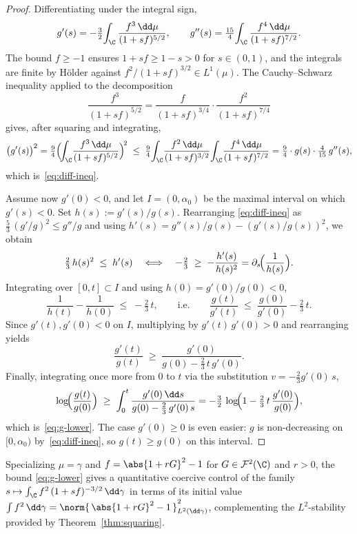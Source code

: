 \begin{proof}
Differentiating under the integral sign,
\[
g'(s) = -\tfrac{3}{2}\!\int_{\C}\frac{f^3\,\dd\mu}{(1+sf)^{5/2}},
\qquad
g''(s) = \tfrac{15}{4}\!\int_{\C}\frac{f^4\,\dd\mu}{(1+sf)^{7/2}}.
\]
The bound $f \ge -1$ ensures $1 + sf \ge 1-s > 0$ for $s \in (0,1)$, and
the integrals are finite by H\"older against $f^2/(1+sf)^{3/2} \in
L^1(\mu)$. The Cauchy--Schwarz inequality applied to the decomposition
\[
\frac{f^3}{(1+sf)^{5/2}}
= \frac{f}{(1+sf)^{3/4}} \cdot \frac{f^2}{(1+sf)^{7/4}}
\]
gives, after squaring and integrating,
\[
\bigl(g'(s)\bigr)^2
= \tfrac{9}{4}\Bigl(\!\int_{\C}\!\frac{f^3\,\dd\mu}{(1+sf)^{5/2}}\Bigr)^{\!2}
\;\le\; \tfrac{9}{4}\!\int_{\C}\!\frac{f^2\,\dd\mu}{(1+sf)^{3/2}}
\!\int_{\C}\!\frac{f^4\,\dd\mu}{(1+sf)^{7/2}}
= \tfrac{9}{4}\cdot g(s)\cdot \tfrac{4}{15}\,g''(s),
\]
which is~\eqref{eq:diff-ineq}.

\medskip

Assume now $g'(0) < 0$, and let $I = (0,\alpha_0)$ be the maximal interval
on which $g'(s) < 0$. Set $h(s) := g'(s)/g(s)$. Rearranging
\eqref{eq:diff-ineq} as $\tfrac{5}{3}\,(g'/g)^2 \le g''/g$ and using
$h'(s) = g''(s)/g(s) - (g'(s)/g(s))^2$, we obtain
\[
\tfrac{2}{3}\,h(s)^2
\;\le\; h'(s)
\quad\Longleftrightarrow\quad
-\tfrac{2}{3}
\;\ge\; -\frac{h'(s)}{h(s)^2}
= \partial_s\!\Bigl(\frac{1}{h(s)}\Bigr).
\]
Integrating over $[0,t] \subset I$ and using $h(0) = g'(0)/g(0) < 0$,
\[
\frac{1}{h(t)} - \frac{1}{h(0)}
\;\le\; -\tfrac{2}{3}\,t,
\qquad
\text{i.e.}\qquad
\frac{g(t)}{g'(t)}
\;\le\; \frac{g(0)}{g'(0)} - \tfrac{2}{3}\,t.
\]
Since $g'(t),g'(0) < 0$ on $I$, multiplying by $g'(t)\,g'(0)>0$ and
rearranging yields
\[
\frac{g'(t)}{g(t)}
\;\ge\; \frac{g'(0)}{g(0) - \tfrac{2}{3}\,t\,g'(0)}.
\]
Finally, integrating once more from $0$ to $t$ via the substitution
$v = -\tfrac{2}{3}g'(0)\,s$,
\[
\log\!\Bigl(\frac{g(t)}{g(0)}\Bigr)
\;\ge\;
\int_0^t \frac{g'(0)\,\dd s}{g(0) - \tfrac{2}{3}\,g'(0)\,s}
= -\tfrac{3}{2}\,
\log\!\Bigl(1 - \tfrac{2}{3}\,t\,\frac{g'(0)}{g(0)}\Bigr),
\]
which is~\eqref{eq:g-lower}. The case $g'(0) \ge 0$ is even easier:
$g$ is non-decreasing on $[0, \alpha_0)$ by~\eqref{eq:diff-ineq}, so
$g(t) \ge g(0)$ on this interval.
\end{proof}

Specializing $\mu = \gamma$ and $f = \abs{1+rG}^2 - 1$ for $G \in
\mathcal{F}^2(\C)$ and $r > 0$, the bound \eqref{eq:g-lower} gives a
quantitative coercive control of the family
$s \mapsto \int_{\C} f^2\,(1+sf)^{-3/2}\,\dd\gamma$
in terms of its initial value $\int f^2\,\dd\gamma =
\norm{\,\abs{1+rG}^2 - 1\,}_{L^2(\dd\gamma)}^2$, complementing the
$L^2$-stability provided by Theorem~\ref{thm:squaring}.
